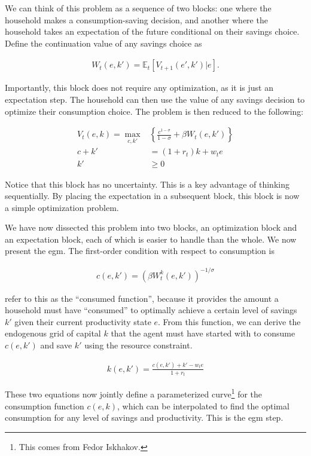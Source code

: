 \documentclass{article}
\begin{document}
We can think of this problem as a sequence of two blocks: one where the household makes a consumption-saving decision, and another where the household takes an expectation of the future conditional on their savings choice. Define the continuation value of any savings choice as

\begin{align}
W_t(e, k') = \mathbb{E}_t\left[V_{t+1}(e', k')|e \right].
\end{align}

Importantly, this block does not require any optimization, as it is just an expectation step. The household can then use the value of any savings decision to optimize their consumption choice. The problem is then reduced to the following:

\begin{align}
    V_t(e, k) = \max_{c, k'} & \left\{\frac{c^{1-\sigma}}{1-\sigma} + \beta W_t(e, k') \right\}
    \\ c + k' &= (1 + r_t)k + w_t e
    \\ k' &\geq 0
\end{align}

Notice that this block has no uncertainty. This is a key advantage of thinking sequentially. By placing the expectation in a subsequent block, this block is now a simple optimization problem.

We have now dissected this problem into two blocks, an optimization block and an expectation block, each of which is easier to handle than the whole. We now present the \acrshort{egm}. The first-order condition with respect to consumption is

\begin{align}
c(e, k') = (\beta W_t^k(e, k'))^{-1/\sigma}
\end{align}

\cite{SolvingMicroDSOPs} refer to this as the ``consumed function'', because it provides the amount a household must have ``consumed'' to optimally achieve a certain level of savings $k'$ given their current productivity state $e$. From this function, we can derive the endogenous grid of capital $k$ that the agent must have started with to consume $c(e, k')$ and save $k'$ using the resource constraint.

\begin{align}
k(e, k') = \frac{c(e, k') + k' - w_t e }{1+r_t}
\end{align}

These two equations now jointly define a parameterized curve\footnote{This comes from Fedor Iskhakov.} for the consumption function $c(e, k)$, which can be interpolated to find the optimal consumption for any level of savings and productivity. This is the \acrshort{egm} step.
\end{document}
